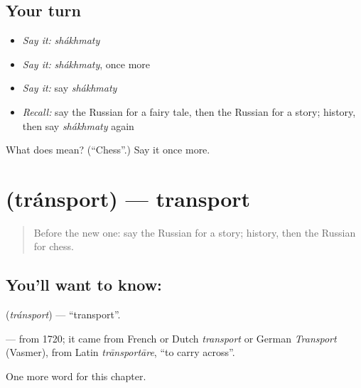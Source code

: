 \subsection*{Your turn}
\begin{itemize}
\raggedright
  \item \emph{Say it:} \emph{shákhmaty}
  \item \emph{Say it:} \emph{shákhmaty}, once more
  \item \emph{Say it:} say \emph{shákhmaty}
  \item \emph{Recall:} say the Russian for a fairy tale, then the Russian for a story; history, then say \emph{shákhmaty} again
\end{itemize}

\begin{tcolorbox}[breakable,colback=teal!4,colframe=teal!35!black,title={Before you move on}]
What does  mean? (\textquotedblleft{}Chess\textquotedblright{}.) Say it once more.
\end{tcolorbox}
\section[\texorpdfstring{\ru{транспорт} (tránsport)}{транспорт (tránsport)}]{ (tránsport) — transport}

\label{lesson:RU-C253-transport}



\begin{quote}
Before the new one: say the Russian for a story; history, then the Russian for chess.
\end{quote}

\subsection*{You'll want to know: }
\textbf{} (\emph{tránsport}) — \textquotedblleft{}transport\textquotedblright{}.

\begin{cousinweb}
\textbf{} — from 1720; it came from French or Dutch \emph{transport} or German \emph{Transport} (Vasmer), from Latin \emph{trānsportāre}, \textquotedblleft{}to carry across\textquotedblright{}.
\end{cousinweb}

\begin{grammarlens}[title={What you've built}]
One more word for this chapter.
\end{grammarlens}

